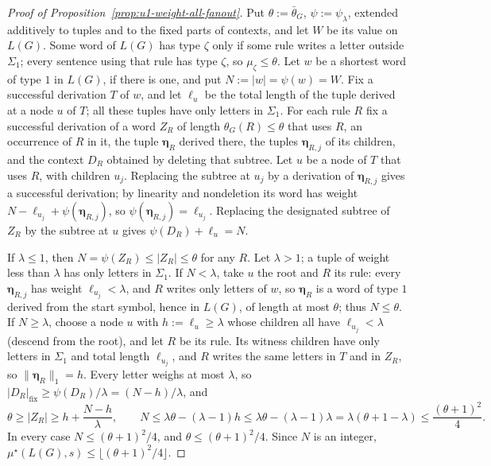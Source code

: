 \begin{proof}[Proof of Proposition~\ref{prop:u1-weight-all-fanout}]
Put $\theta:=\bar\theta_G$, $\psi:=\psi_\lambda$, extended additively to tuples and
to the fixed parts of contexts, and let $W$ be its value on $L(G)$.  Some word of
$L(G)$ has type $\zeta$ only if some rule writes a letter outside $\Sigma_1$;
every sentence using that rule has type $\zeta$, so $\mu_\zeta\le\theta$.  Let
$w$ be a shortest word of type $1$ in $L(G)$, if there is one, and put
$N:=|w|=\psi(w)=W$.  Fix a successful derivation $T$ of $w$, and let $\ell_u$ be
the total length of the tuple derived at a node $u$ of $T$; all these tuples have
only letters in $\Sigma_1$.  For each rule $R$ fix a successful derivation of a
word $Z_R$ of length $\theta_G(R)\le\theta$ that uses $R$, an occurrence of $R$
in it, the tuple $\boldsymbol\eta_R$ derived there, the tuples
$\boldsymbol\eta_{R,j}$ of its children, and the context $D_R$ obtained by
deleting that subtree.  Let $u$ be a node of $T$ that uses $R$, with children
$u_j$.  Replacing the subtree at $u_j$ by a derivation of $\boldsymbol\eta_{R,j}$
gives a successful derivation; by linearity and nondeletion its word has weight
$N-\ell_{u_j}+\psi(\boldsymbol\eta_{R,j})$, so
$\psi(\boldsymbol\eta_{R,j})=\ell_{u_j}$.  Replacing the designated subtree of
$Z_R$ by the subtree at $u$ gives $\psi(D_R)+\ell_u=N$.

If $\lambda\le1$, then $N=\psi(Z_R)\le|Z_R|\le\theta$ for any $R$.  Let $\lambda>1$;
a tuple of weight less than $\lambda$ has only letters in $\Sigma_1$.  If
$N<\lambda$, take $u$ the root and $R$ its rule: every $\boldsymbol\eta_{R,j}$ has
weight $\ell_{u_j}<\lambda$, and $R$ writes only letters of $w$, so
$\boldsymbol\eta_R$ is a word of type $1$ derived from the start symbol, hence in
$L(G)$, of length at most $\theta$; thus $N\le\theta$.  If $N\ge\lambda$, choose a
node $u$ with $h:=\ell_u\ge\lambda$ whose children all have $\ell_{u_j}<\lambda$
(descend from the root), and let $R$ be its rule.  Its witness children have only
letters in $\Sigma_1$ and total length $\ell_{u_j}$, and $R$ writes the same
letters in $T$ and in $Z_R$, so $\|\boldsymbol\eta_R\|_1=h$.  Every letter weighs
at most $\lambda$, so $|D_R|_{\mathrm{fix}}\ge\psi(D_R)/\lambda=(N-h)/\lambda$, and
\[
 \theta\ge|Z_R|\ge h+\frac{N-h}{\lambda},\qquad
 N\le\lambda\theta-(\lambda-1)h\le\lambda\theta-(\lambda-1)\lambda
 =\lambda(\theta+1-\lambda)\le\frac{(\theta+1)^2}{4}.
\]
In every case $N\le(\theta+1)^2/4$, and $\theta\le(\theta+1)^2/4$.  Since $N$ is an
integer, $\mu^\star(L(G),s)\le\lfloor(\theta+1)^2/4\rfloor$.
\end{proof}

